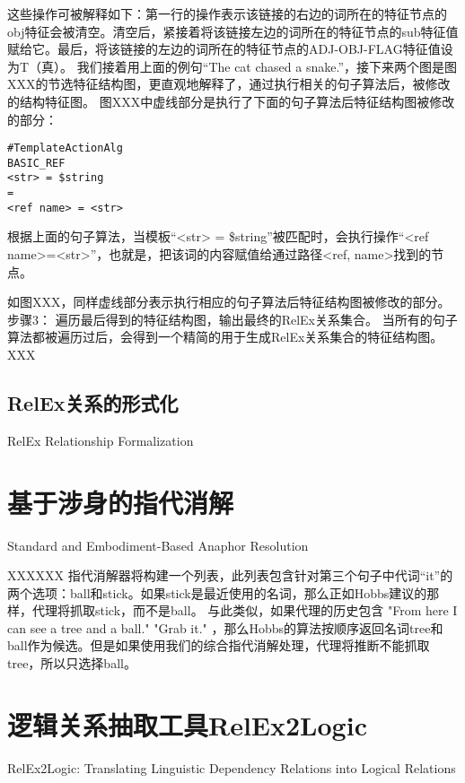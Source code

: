 这些操作可被解释如下：第一行的操作表示该链接的右边的词所在的特征节点的obj特征会被清空。清空后，紧接着将该链接左边的词所在的特征节点的sub特征值赋给它。最后，将该链接的左边的词所在的特征节点的ADJ-OBJ-FLAG特征值设为T（真）。
我们接着用上面的例句“The cat chased a snake.”，接下来两个图是图XXX的节选特征结构图，更直观地解释了，通过执行相关的句子算法后，被修改的结构特征图。  
图XXX中虚线部分是执行了下面的句子算法后特征结构图被修改的部分：
\begin{verbatim}
#TemplateActionAlg
BASIC_REF
<str> = $string
=
<ref name> = <str>
\end{verbatim}
根据上面的句子算法，当模板“<str> = \$string”被匹配时，会执行操作“<ref name>=<str>”，也就是，把该词的内容赋值给通过路径<ref, name>找到的节点。
 
如图XXX，同样虚线部分表示执行相应的句子算法后特征结构图被修改的部分。
     步骤3： 遍历最后得到的特征结构图，输出最终的RelEx关系集合。
当所有的句子算法都被遍历过后，会得到一个精简的用于生成RelEx关系集合的特征结构图。
XXX

\subsection{RelEx关系的形式化}{RelEx Relationship Formalization}


\section{基于涉身的指代消解}{Standard and Embodiment-Based Anaphor Resolution}


XXXXXX
指代消解器将构建一个列表，此列表包含针对第三个句子中代词“it”的两个选项：ball和stick。如果stick是最近使用的名词，那么正如Hobbs建议的那样，代理将抓取stick，而不是ball。
与此类似，如果代理的历史包含
"From here I can see a tree and a ball."
"Grab it."
，那么Hobbs的算法按顺序返回名词tree和ball作为候选。但是如果使用我们的综合指代消解处理，代理将推断不能抓取tree，所以只选择ball。



\section{逻辑关系抽取工具RelEx2Logic}{RelEx2Logic: Translating Linguistic Dependency Relations into Logical Relations}  

